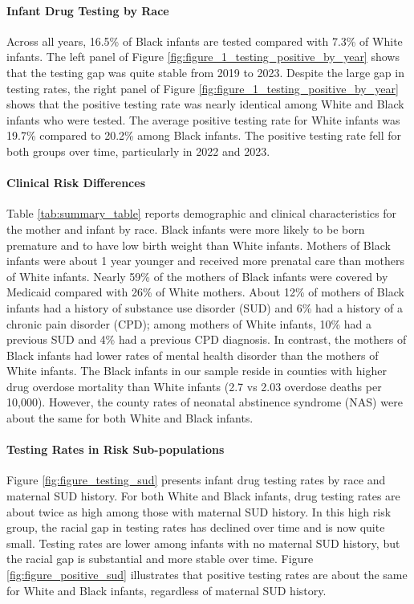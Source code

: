 \paragraph*{Infant Drug Testing by Race}

Across all years, 16.5\% of Black infants are tested compared with 7.3\% of White infants. The left panel of Figure \ref{fig:figure_1_testing_positive_by_year} shows that the testing gap was quite stable from 2019 to 2023. Despite the large gap in testing rates, the right panel of Figure \ref{fig:figure_1_testing_positive_by_year} shows that the positive testing rate was nearly identical among White and Black infants who were tested. The average positive testing rate for White infants was 19.7\% compared to 20.2\% among Black infants. The positive testing rate fell for both groups over time, particularly in 2022 and 2023. 

\paragraph*{Clinical Risk Differences}

Table \ref{tab:summary_table} reports demographic and clinical characteristics for the mother and infant by race. Black infants were more likely to be born premature and to have low birth weight than White infants. Mothers of Black infants were about 1 year younger and received more prenatal care than mothers of White infants. Nearly 59\% of the mothers of Black infants were covered by Medicaid compared with 26\% of White mothers. About 12\% of mothers of Black infants had a history of substance use disorder (SUD) and 6\% had a history of a chronic pain disorder (CPD); among mothers of White infants, 10\% had a previous SUD and 4\% had a previous CPD diagnosis. In contrast, the mothers of Black infants had lower rates of mental health disorder than the mothers of White infants. The Black infants in our sample reside in counties with higher drug overdose mortality than White infants (2.7 vs 2.03 overdose deaths per 10,000). However, the county rates of neonatal abstinence syndrome (NAS) were about the same for both White and Black infants.

\paragraph*{Testing Rates in Risk Sub-populations}

Figure \ref{fig:figure_testing_sud} presents infant drug testing rates by race and maternal SUD history. For both White and Black infants, drug testing rates are about twice as high among those with maternal SUD history. In this high risk group, the racial gap in testing rates has declined over time and is now quite small. Testing rates are lower among infants with no maternal SUD history, but the racial gap is substantial and more stable over time. Figure \ref{fig:figure_positive_sud} illustrates that positive testing rates are about the same for White and Black infants, regardless of maternal SUD history.

